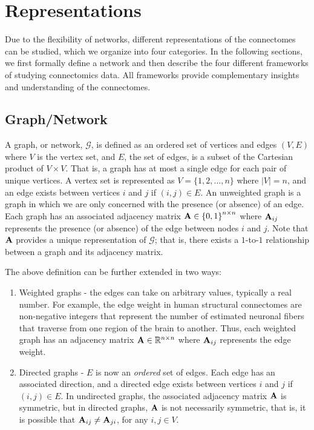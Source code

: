 \section{Representations}\label{sec:representations}
Due to the flexibility of networks, different representations of the connectomes can be studied, which we organize into four categories. In the following sections, we first formally define a network and then describe the four different frameworks of studying connectomics data. All frameworks provide complementary insights and understanding of the connectomes. 

\subsection{Graph/Network}
\label{sec:unwt_graph}
A graph, or network, $\mathcal{G}$, is defined as an ordered set of vertices and edges $(V, E)$ where $V$ is the vertex set, and $E$, the set of edges, is a subset of the Cartesian product of $V \times V$. That is, a graph has at most a single edge for each pair of unique vertices. A vertex set is represented as $V=\{1, 2, \ldots, n\}$ where $|V| = n$, and an edge exists between vertices $i$ and $j$ if $(i, j)\in E$. An unweighted graph is a graph in which we are only concerned with the presence (or absence) of an edge. Each graph has an associated adjacency matrix $\operatorname{\mathbf{A}} \in \left\{0, 1\right\}^{n\times n}$ where $\operatorname{\mathbf{A}}_{ij}$ represents the presence (or absence) of the edge between nodes $i$ and $j$. Note that $\operatorname{\mathbf{A}}$ provides a unique representation of $\mathcal{G}$; that is, there exists a $1$-to-$1$ relationship between a graph and its adjacency matrix. 

The above definition can be further extended in two ways: 
\begin{enumerate}
    \item Weighted graphs - the edges can take on arbitrary values, typically a real number. For example, the edge weight in human structural connectomes are non-negative integers that represent the number of estimated neuronal fibers that traverse from one region of the brain to another. Thus, each weighted graph has an adjacency matrix $\operatorname{\mathbf{A}}\in\mathbb{R}^{n \times n}$ where $\operatorname{\mathbf{A}}_{ij}$ represents the edge weight.
    \item Directed graphs - $E$ is now an \textit{ordered} set of edges. Each edge has an associated direction, and a directed edge exists between vertices $i$ and $j$ if $(i,j)\in E$. In undirected graphs, the associated adjacency matrix $\operatorname{\mathbf{A}}$ is symmetric, but in directed graphs, $\operatorname{\mathbf{A}}$ is not necessarily symmetric, that is, it is possible that $\operatorname{\mathbf{A}}_{ij}\neq\operatorname{\mathbf{A}}_{ji}$, for any $i, j\in V$.
\end{enumerate}

